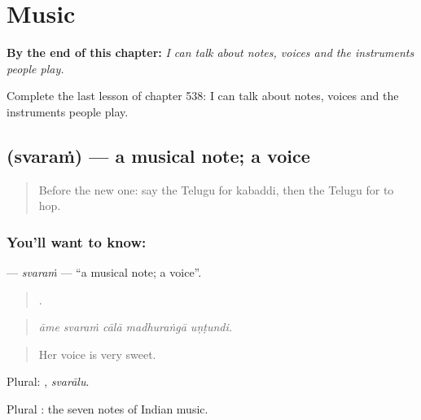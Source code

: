 
\chapter{Music}
\label{ch:te-music}

\begin{chapteropening}
\textbf{By the end of this chapter:} \emph{I can talk about notes, voices and the instruments people play.}

Complete the last lesson of chapter 538: I can talk about notes, voices and the instruments people play.
\end{chapteropening}

\section[\texorpdfstring{\te{స్వరం} (svaraṁ)}{స్వరం (svaraṁ)}]{ (svaraṁ) — a musical note; a voice}

\label{lesson:TE-C538-svaram}



\begin{quote}
Before the new one: say the Telugu for kabaddi, then the Telugu for to hop.
\end{quote}

\subsection*{You'll want to know: }
\textbf{} — \emph{svaraṁ} — \textquotedblleft{}a musical note; a voice\textquotedblright{}.

\begin{quote}
    .
\end{quote}

\begin{quote}
\emph{āme svaraṁ cālā madhuraṅgā uṇṭundi.}
\end{quote}

\begin{quote}
Her voice is very sweet.
\end{quote}

Plural: , \emph{svarālu}.

Plural : the seven notes of Indian music.


